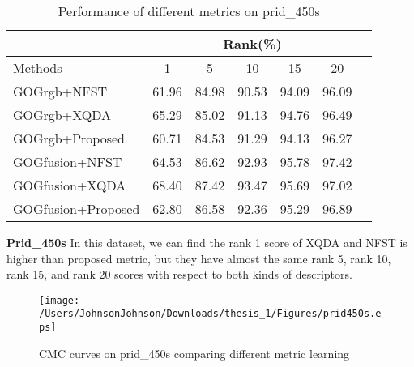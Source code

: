 \begin{table}[H]
\caption{Performance of different metrics on prid\_450s}
\centering
\begin{tabular}{|l|c|c|c|c|c|c|}
\hline
& \multicolumn{5}{|c|}{Rank(\%)} \\
\hline
Methods& 1 & 5 &10& 15&20\\
\hline
GOGrgb+NFST& 61.96&84.98 &90.53& 94.09&96.09 \\  %
\hline
GOGrgb+XQDA&65.29 &85.02 & 91.13&94.76& 96.49\\ 
\hline
GOGrgb+Proposed&60.71&84.53&91.29&94.13&96.27\\  %
\hline
GOGfusion+NFST& 64.53&86.62 & 92.93&95.78&97.42 \\ 
\hline
GOGfusion+XQDA&68.40 & 87.42&93.47 &95.69& 97.02\\ 
\hline
GOGfusion+Proposed&62.80&86.58&92.36&95.29& 96.89\\ %

\hline

\end{tabular}
\end{table}
\textbf{Prid\_450s} In this dataset, we can find the rank 1 score of XQDA and NFST is higher than proposed metric, but they have almost the same rank 5, rank 10, rank 15, and rank 20 scores with respect to both kinds of descriptors.  

\begin{figure}[H]
\begin{raggedleft}
\texttt{[image: /Users/JohnsonJohnson/Downloads/thesis\_1/Figures/prid450s.eps]}
\vspace{-3em}
\caption{CMC curves on prid\_450s comparing different metric learning}
\end{raggedleft}
\end{figure}

